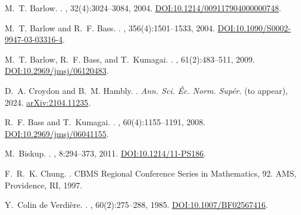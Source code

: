 \documentclass[12pt]{amsart}
\theoremstyle{definition}
\theoremstyle{remark}
\begin{document}

\begin{thebibliography}{99}

M.~T. Barlow.
.
, 32(4):3024--3084, 2004.
\newblock \href{https://doi.org/10.1214/009117904000000748}{DOI:10.1214/009117904000000748}.

M.~T. Barlow and R.~F. Bass.
.
, 356(4):1501--1533, 2004.
\newblock \href{https://doi.org/10.1090/S0002-9947-03-03316-4}{DOI:10.1090/S0002-9947-03-03316-4}.

M.~T. Barlow, R.~F. Bass, and T.~Kumagai.
.
, 61(2):483--511, 2009.
\newblock \href{https://doi.org/10.2969/jmsj/06120483}{DOI:10.2969/jmsj/06120483}.

D.~A. Croydon and B.~M. Hambly.
.
\newblock \emph{Ann. Sci. Éc. Norm. Supér.} (to appear), 2024.
\newblock \href{https://arxiv.org/abs/2104.11235}{arXiv:2104.11235}.

R.~F. Bass and T.~Kumagai.
.
, 60(4):1155--1191, 2008.
\newblock \href{https://doi.org/10.2969/jmsj/06041155}{DOI:10.2969/jmsj/06041155}.

M.~Biskup.
.
, 8:294--373, 2011.
\newblock \href{https://doi.org/10.1214/11-PS186}{DOI:10.1214/11-PS186}.

F.~R.~K. Chung.
.
\newblock CBMS Regional Conference Series in Mathematics, 92. AMS, Providence, RI, 1997.

Y.~Colin de Verdière.
.
, 60(2):275--288, 1985.
\newblock \href{https://doi.org/10.1007/BF02567416}{DOI:10.1007/BF02567416}.


\end{thebibliography}
\end{document}
